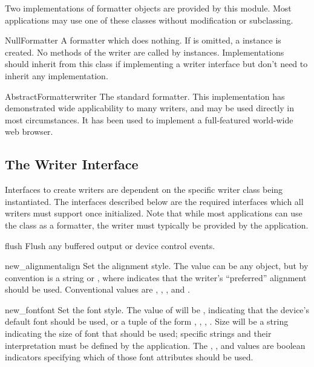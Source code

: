 Two implementations of formatter objects are provided by this module.
Most applications may use one of these classes without modification or
subclassing.

\begin{classdesc}{NullFormatter}{}
A formatter which does nothing.  If  is omitted, a
 instance is created.  No methods of the writer are
called by  instances.  Implementations should
inherit from this class if implementing a writer interface but don't
need to inherit any implementation.
\end{classdesc}

\begin{classdesc}{AbstractFormatter}{writer}
The standard formatter.  This implementation has demonstrated wide
applicability to many writers, and may be used directly in most
circumstances.  It has been used to implement a full-featured
world-wide web browser.
\end{classdesc}



\subsection{The Writer Interface \label{writer-interface}}

Interfaces to create writers are dependent on the specific writer
class being instantiated.  The interfaces described below are the
required interfaces which all writers must support once initialized.
Note that while most applications can use the
 class as a formatter, the writer must
typically be provided by the application.


\begin{methoddesc}[writer]{flush}{}
Flush any buffered output or device control events.
\end{methoddesc}

\begin{methoddesc}[writer]{new_alignment}{align}
Set the alignment style.  The  value can be any object,
but by convention is a string or , where 
indicates that the writer's ``preferred'' alignment should be used.
Conventional  values are , ,
, and .
\end{methoddesc}

\begin{methoddesc}[writer]{new_font}{font}
Set the font style.  The value of  will be ,
indicating that the device's default font should be used, or a tuple
of the form \code{(}, , ,
\code{)}.  Size will be a string indicating the size of
font that should be used; specific strings and their interpretation
must be defined by the application.  The , , and
 values are boolean indicators specifying which of those
font attributes should be used.
\end{methoddesc}

